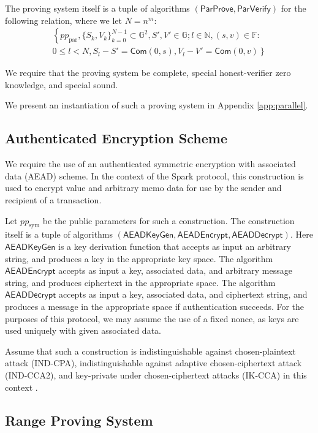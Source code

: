\documentclass{llncs}
\newcommand{\G}{\mathbb{G}}
\newcommand{\F}{\mathbb{F}}
\newcommand{\func}[1]{\mathsf{#1}}
\newcommand{\com}{\func{Com}}
\begin{document}
The proving system itself is a tuple of algorithms $(\func{ParProve},\func{ParVerify})$ for the following relation, where we let $N = n^m$:
\begin{multline*}
\left\{ pp_{\text{par}}, \{S_k,V_k\}_{k=0}^{N-1} \subset \G^2, S',V' \in \G ; l \in \mathbb{N}, (s,v) \in \F : \right. \\
\left. 0 \leq l < N, S_l - S' = \com(0,s), V_l - V' = \com(0,v) \right\}
\end{multline*}

We require that the proving system be complete, special honest-verifier zero knowledge, and special sound.

We present an instantiation of such a proving system in Appendix \ref{app:parallel}.


\subsection{Authenticated Encryption Scheme}

We require the use of an authenticated symmetric encryption with associated data (AEAD) scheme.
In the context of the Spark protocol, this construction is used to encrypt value and arbitrary memo data for use by the sender and recipient of a transaction.

Let $pp_{\text{sym}}$ be the public parameters for such a construction.
The construction itself is a tuple of algorithms $(\func{AEADKeyGen},\func{AEADEncrypt},\func{AEADDecrypt})$.
Here $\func{AEADKeyGen}$ is a key derivation function that accepts as input an arbitrary string, and produces a key in the appropriate key space.
The algorithm $\func{AEADEncrypt}$ accepts as input a key, associated data, and arbitrary message string, and produces ciphertext in the appropriate space.
The algorithm $\func{AEADDecrypt}$ accepts as input a key, associated data, and ciphertext string, and produces a message in the appropriate space if authentication succeeds.
For the purposes of this protocol, we may assume the use of a fixed nonce, as keys are used uniquely with given associated data.

Assume that such a construction is indistinguishable against chosen-plaintext attack (IND-CPA), indistinguishable against adaptive chosen-ciphertext attack (IND-CCA2), and key-private under chosen-ciphertext attacks (IK-CCA) in this context \cite{keyprivacy}.


\subsection{Range Proving System}
\end{document}
